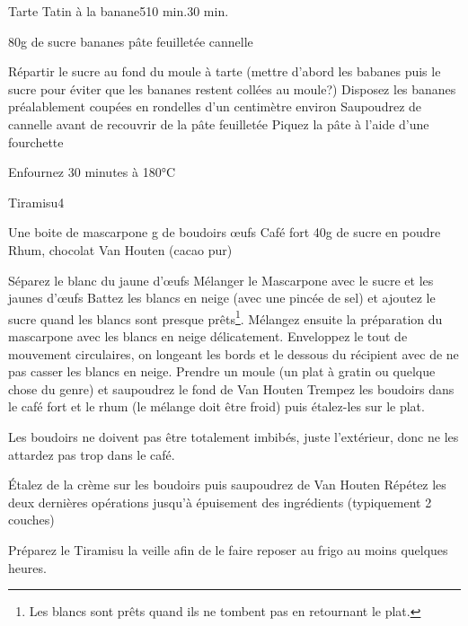 \begin{recette}{Tarte Tatin à la banane}{5}{10 min.}{30 min.}
\begin{ingredients}
\ingredient 80g de sucre
 bananes
 pâte feuilletée
\ingredient cannelle
\end{ingredients}

\begin{preparation}
\etape Répartir le sucre au fond du moule à tarte (mettre d'abord les babanes puis le sucre pour éviter que les bananes restent 
collées au moule?)
\etape Disposez les bananes préalablement coupées en rondelles d'un centimètre environ
\etape Saupoudrez de cannelle avant de recouvrir de la pâte feuilletée
\etape Piquez la pâte à l'aide d'une fourchette
\end{preparation}

\begin{cuisson}
Enfournez 30 minutes à 180°C
\end{cuisson}
\end{recette}

\begin{recette}{Tiramisu}{4}{}{}
\begin{ingredients}
\ingredient Une boite de mascarpone
 g de boudoirs
 œufs
\ingredient Café fort
\ingredient 40g de sucre en poudre
\ingredient Rhum, chocolat Van Houten (cacao pur)
\end{ingredients}

\begin{preparation}
\etape Séparez le blanc du jaune d'œufs
\etape Mélanger le Mascarpone avec le sucre et les jaunes d'œufs
\etape Battez les blancs en neige (avec une pincée de sel) et ajoutez le sucre quand les blancs sont presque prêts\footnote{Les blancs sont prêts quand ils ne tombent pas en retournant le plat.}.
\etape Mélangez ensuite la préparation du mascarpone avec les blancs en neige délicatement. Enveloppez le tout de mouvement circulaires, on longeant les bords et le dessous du récipient avec de ne pas casser les blancs en neige.
\etape Prendre un moule (un plat à gratin ou quelque chose du genre) et saupoudrez le fond de Van Houten
\etape Trempez les boudoirs dans le café fort et le rhum (le mélange doit être froid) puis étalez-les sur le plat.
\begin{remarque}
Les boudoirs ne doivent pas être totalement imbibés, juste l'extérieur, donc ne les attardez pas trop dans le café.
\end{remarque}
\etape Étalez de la crème sur les boudoirs puis saupoudrez de Van Houten
\etape Répétez les deux dernières opérations jusqu'à épuisement des ingrédients (typiquement 2 couches)
\end{preparation}

\begin{remarque}
Préparez le Tiramisu la veille afin de le faire reposer au frigo au moins quelques heures.
\end{remarque}
\end{recette}

